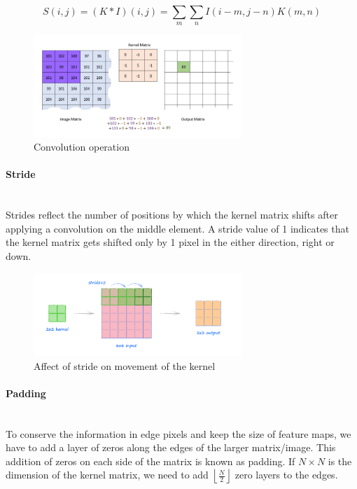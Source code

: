 \documentclass[runningheads]{llncs}
\begin{document}
\begin{equation}
S(i, j)=(K * I)(i, j)=\sum_{m} \sum_{n} I(i-m, j-n) K(m, n)
\end{equation} 

\begin{figure}[H]
    \centering
    \includegraphics[width=0.7\textwidth]{Figures/convolution.png}
    \caption{Convolution operation }
    \label{fig:my_label}
\end{figure} 

\paragraph{\bf Stride}\hspace*{\fill} \\
Strides reflect the number of positions by which the kernel matrix shifts after applying a convolution on the middle element. A stride value of 1 indicates that the kernel matrix gets shifted only by 1 pixel in the either direction, right or down.\cite{cnn_project}
\begin{figure}[H]
    \centering
    \includegraphics[width=0.7\textwidth]{Figures/stride.png}
    \caption{Affect of stride on movement of the kernel}
    \label{fig:stride}
\end{figure}

\paragraph{\bf Padding}\hspace*{\fill} \\
To conserve the information in edge pixels and keep the size of feature maps, we have to add a layer of zeros along the edges of the larger matrix/image. This addition of zeros on each side of the matrix is known as padding. If $N \times N$ is the dimension of the kernel matrix, we need to add $ \left\lfloor\frac{N}{2}\right\rfloor $ zero layers to the edges. \cite{cnn_project}
\end{document}
